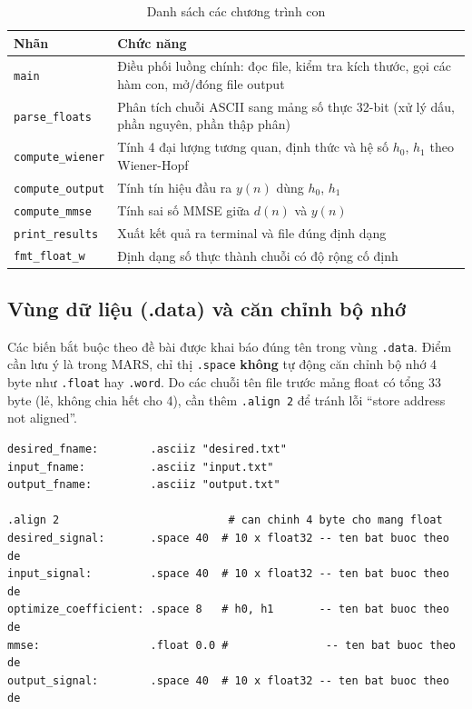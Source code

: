 \documentclass[twoside,final]{hcmut-report}
\begin{document}
\begin{table}[H]
  \centering
  \caption{Danh sách các chương trình con}
  \label{tab:subroutines}
  \begin{tabularx}{\linewidth}{lX}
    \toprule
    \textbf{Nhãn} & \textbf{Chức năng} \\
    \midrule
    \texttt{main}            & Điều phối luồng chính: đọc file, kiểm tra kích thước,
                               gọi các hàm con, mở/đóng file output \\
    \texttt{parse\_floats}   & Phân tích chuỗi ASCII sang mảng số thực 32-bit
                               (xử lý dấu, phần nguyên, phần thập phân) \\
    \texttt{compute\_wiener} & Tính 4 đại lượng tương quan, định thức và hệ số
                               $h_0$, $h_1$ theo Wiener-Hopf \\
    \texttt{compute\_output} & Tính tín hiệu đầu ra $y(n)$ dùng $h_0$, $h_1$ \\
    \texttt{compute\_mmse}   & Tính sai số MMSE giữa $d(n)$ và $y(n)$ \\
    \texttt{print\_results}  & Xuất kết quả ra terminal và file đúng định dạng \\
    \texttt{fmt\_float\_w}   & Định dạng số thực thành chuỗi có độ rộng cố định \\
    \bottomrule
  \end{tabularx}
\end{table}

\subsection{Vùng dữ liệu (.data) và căn chỉnh bộ nhớ}

Các biến bắt buộc theo đề bài được khai báo đúng tên trong vùng \texttt{.data}.
Điểm cần lưu ý là trong MARS, chỉ thị \texttt{.space} \textbf{không} tự
động căn chỉnh bộ nhớ 4 byte như \texttt{.float} hay \texttt{.word}. Do
các chuỗi tên file trước mảng float có tổng $33$ byte (lẻ, không chia hết
cho 4), cần thêm \texttt{.align~2} để tránh lỗi ``store address not aligned''.

\begin{lstlisting}[language={}, caption={Khai báo các biến bắt buộc trong .data}]
desired_fname:        .asciiz "desired.txt"
input_fname:          .asciiz "input.txt"
output_fname:         .asciiz "output.txt"

.align 2                          # can chinh 4 byte cho mang float
desired_signal:       .space 40  # 10 x float32 -- ten bat buoc theo de
input_signal:         .space 40  # 10 x float32 -- ten bat buoc theo de
optimize_coefficient: .space 8   # h0, h1       -- ten bat buoc theo de
mmse:                 .float 0.0 #               -- ten bat buoc theo de
output_signal:        .space 40  # 10 x float32 -- ten bat buoc theo de
\end{lstlisting}
\end{document}

